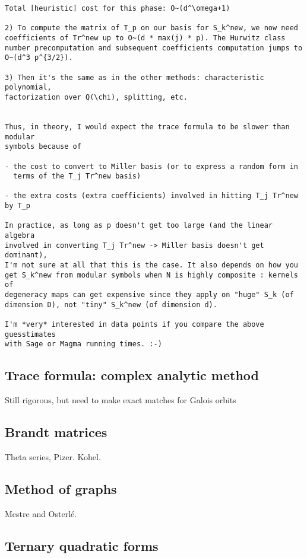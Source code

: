 \documentclass[11pt]{amsart}
\numberwithin{equation}{subsection}
\theoremstyle{plain}
\theoremstyle{definition}
\begin{document}
\begin{verbatim}
Total [heuristic] cost for this phase: O~(d^\omega+1)

2) To compute the matrix of T_p on our basis for S_k^new, we now need
coefficients of Tr^new up to O~(d * max(j) * p). The Hurwitz class
number precomputation and subsequent coefficients computation jumps to
O~(d^3 p^{3/2}).

3) Then it's the same as in the other methods: characteristic polynomial,
factorization over Q(\chi), splitting, etc.


Thus, in theory, I would expect the trace formula to be slower than modular
symbols because of

- the cost to convert to Miller basis (or to express a random form in
  terms of the T_j Tr^new basis)

- the extra costs (extra coefficients) involved in hitting T_j Tr^new by T_p

In practice, as long as p doesn't get too large (and the linear algebra
involved in converting T_j Tr^new -> Miller basis doesn't get dominant),
I'm not sure at all that this is the case. It also depends on how you
get S_k^new from modular symbols when N is highly composite : kernels of
degeneracy maps can get expensive since they apply on "huge" S_k (of
dimension D), not "tiny" S_k^new (of dimension d).

I'm *very* interested in data points if you compare the above guesstimates
with Sage or Magma running times. :-)
\end{verbatim}

\subsection{Trace formula: complex analytic method}

Still rigorous, but need to make exact matches for Galois orbits

\subsection{Brandt matrices}

Theta series, Pizer.  Kohel.  

\subsection{Method of graphs}

Mestre and Osterl\'e.  

\subsection{Ternary quadratic forms}
\end{document}
